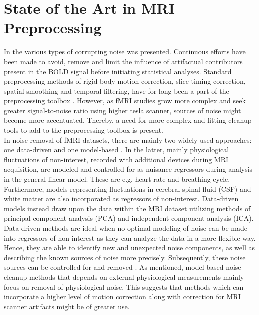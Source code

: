 \section{State of the Art in MRI Preprocessing} \label{art}

In  the various types of corrupting noise was presented. Continuous efforts have been made to avoid, remove and limit the influence of artifactual contributors present in the BOLD signal before initiating statistical analyses. Standard preprocessing methods of rigid-body motion correction, slice timing correction, spatial smoothing and temporal filtering, have for long been a part of the preprocessing toolbox \cite{Poldrack2011,Salimi-Khorshidi2014}. However, as fMRI studies grow more complex and seek greater signal-to-noise ratio using higher tesla scanner, sources of noise might become more accentuated. Thereby, a need for more complex and fitting cleanup tools to add to the preprocessing toolbox is present. \cite{Wood2012,Liu2006} \\
In noise removal of fMRI datasets, there are mainly two widely used approaches: one data-driven and one model-based \cite{Salimi-Khorshidi2014,Iraji2016}. In the latter, mainly physiological fluctuations of non-interest, recorded with additional devices during MRI acquisition, are modeled and controlled for as nuisance regressors during analysis in the general linear model. These are e.g. heart rate and breathing cycle. Furthermore, models representing fluctuations in cerebral spinal fluid (CSF) and white matter are also incorporated as regressors of non-interest. \cite{Salimi-Khorshidi2014,Iraji2016,Monti2011} Data-driven models instead draw upon the data within the MRI dataset utilizing methods of principal component analysis (PCA) and independent component analysis (ICA). Data-driven methods are ideal when no optimal modeling of noise can be made into regressors of non interest as they can analyze the data in a more flexible way. Hence, they are able to identify new and unexpected noise components, as well as describing the known sources of noise more precisely. Subsequently, these noise sources can be controlled for and removed . \cite{Iraji2016} As mentioned, model-based noise cleanup methods that depends on external physiological measurements mainly focus on removal of physiological noise. This suggests that methods which can incorporate a higher level of motion correction along with correction for MRI scanner artifacts might be of greater use. \\
%
